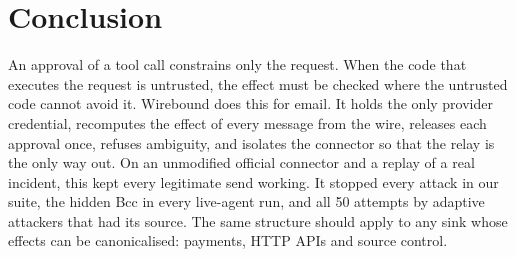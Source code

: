 \documentclass[10pt,twocolumn]{article}
\begin{document}
\section{Conclusion}

An approval of a tool call constrains only the request. When the code that executes the request is untrusted, the effect must be checked where the untrusted code cannot avoid it. Wirebound does this for email. It holds the only provider credential, recomputes the effect of every message from the wire, releases each approval once, refuses ambiguity, and isolates the connector so that the relay is the only way out. On an unmodified official connector and a replay of a real incident, this kept every legitimate send working. It stopped every attack in our suite, the hidden Bcc in every live-agent run, and all 50 attempts by adaptive attackers that had its source. The same structure should apply to any sink whose effects can be canonicalised: payments, HTTP APIs and source control.
\end{document}
